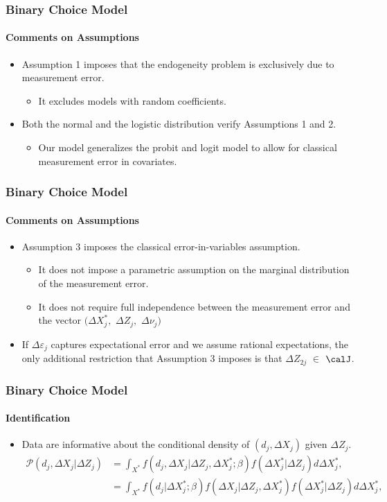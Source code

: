\begin{frame}
\frametitle{Binary Choice Model}
\framesubtitle{Comments on Assumptions}

\begin{itemize}
	\item Assumption 1 imposes that the endogeneity problem is exclusively due to measurement error.
	\begin{itemize}
		\item It excludes models with random coefficients.
	\end{itemize}
	\item Both the normal and the logistic distribution verify Assumptions 1 and 2. 
	\begin{itemize}
		\item Our model generalizes the probit and logit model to allow for classical measurement error in covariates.
	\end{itemize}
\end{itemize}
\end{frame}

\begin{frame}
\frametitle{Binary Choice Model}
\framesubtitle{Comments on Assumptions}

\begin{itemize}
	\item Assumption 3 imposes the classical error-in-variables assumption.
	\begin{itemize}
		\item It does not impose a parametric assumption on the marginal distribution of the measurement error.
		\item It does not require full independence between the measurement error and the vector $(\Delta X^{*}_{j},$ $\Delta Z_{j},$ $\Delta\nu_{j})$
	\end{itemize}
	\item If $\Delta\varepsilon_{j}$ captures expectational error and we assume rational expectations, the only additional restriction that Assumption 3 imposes is that $\Delta Z_{2j}$ $\in$ $\calJ$.
\end{itemize}
\end{frame}

\begin{frame}
\frametitle{Binary Choice Model}
\framesubtitle{Identification}

\begin{itemize}
	\item Data are informative about the conditional density of $(d_{j},\Delta X_{j})$ given $\Delta Z_{j}$. 
	\begin{align*}
	\mathcal{P}(d_{j},\Delta X_{j}|\Delta Z_{j})&=\int_{X^{*}}f(d_{j},\Delta X_{j}|\Delta Z_{j},\Delta X^{*}_{j};\beta)f(\Delta X^{*}_{j}|\Delta Z_{j})d\Delta X^{*}_{j},\\
	&=\int_{X^{*}}f(d_{j}|\Delta X^{*}_{j};\beta)f(\Delta X_{j}|\Delta Z_{j},\Delta X^{*}_{j})f(\Delta X^{*}_{j}|\Delta Z_{j})d\Delta X^{*}_{j},
	\end{align*}
\end{itemize}
\end{frame}


